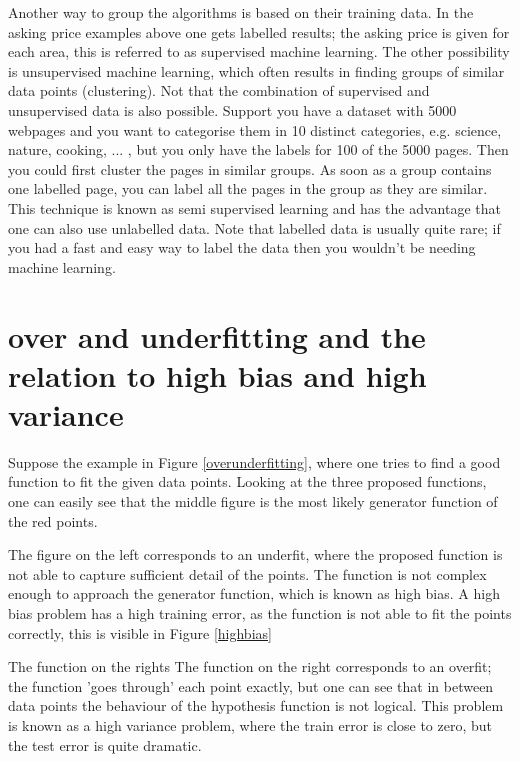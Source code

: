 \npar

Another way to group the algorithms is based on their training data. In the asking price examples above one gets labelled results; the asking price is given for each area, this is referred to as supervised machine learning. The other possibility is unsupervised machine learning, which often results in finding groups of similar data points (clustering). Not that the combination of supervised and unsupervised data is also possible. Support you have a dataset with 5000 webpages and you want to categorise them in 10 distinct categories, e.g. science, nature, cooking, ... , but you only have the labels for 100 of the 5000 pages. Then you could first cluster the pages in similar groups. As soon as a group contains one labelled page, you can label all the pages in the group as they are similar. This technique is known as semi supervised learning and has the advantage that one can also use unlabelled data. Note that labelled data is usually quite rare; if you had a fast and easy way to label the data then you wouldn't be needing machine learning.

\section{over and underfitting and the relation to high bias and high variance}



Suppose the example in Figure \ref{overunderfitting}, where one tries to find a good function to fit the given data points. Looking at the three proposed functions, one can easily see that the middle figure is the most likely generator function of the red points. 

The figure on the left corresponds to an underfit, where the proposed function is not able to capture sufficient detail of the points. The function is not complex enough to approach the generator function, which is known as high bias. A high bias problem has a high training error, as the function is not able to fit the points correctly, this is visible in Figure \ref{highbias}


The function on the rights The function on the right corresponds to an overfit; the function 'goes through' each point exactly, but one can see that in between data points the behaviour of the hypothesis function is not logical. This problem is known as a high variance problem, where the train error is close to zero, but the test error is quite dramatic. 

